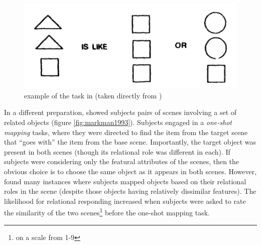 \documentclass[12pt]{article}
\let\oldcite=\cite
\let\oldtextcite=\textcite
\renewcommand{\cite}[1]{\textcolor[rgb]{0, .121, .388}{\oldcite{#1}}}
\renewcommand{\textcite}[1]{\textcolor[rgb]{0, .121, .388}{\oldtextcite{#1}}}
\begin{document}
\begin{figure}[h]
    \centering
    \label{fig:goldstone1991}
    \includegraphics[scale=.4]{figures/goldstone1991.png}
    \caption{example of the task in \textcite{goldstone1991relational} (taken directly from \cite{goldstone1991relational})}
\end{figure}

In a different preparation, \textcite{markman1993structural} showed subjects pairs of scenes involving a set of related objects (figure \ref{fig:markman1993}). Subjects engaged in a \emph{one-shot mapping} tasks, where they were directed to find the item from the target scene that ``goes with'' the item from the base scene. Importantly, the target object was present in both scenes (though its relational role was different in each). If subjects were considering only the featural attributes of the scenes, then the obvious choice is to choose the same object as it appears in both scenes. However, \textcite{markman1993structural} found many instances where subjects mapped objects based on their relational roles in the scene (despite those objects having relatively dissimilar features). The likelihood for relational responding increased when subjects were asked to rate the similarity of the two scenes\footnote{on a scale from 1-9} before the one-shot mapping task. 
\end{document}
